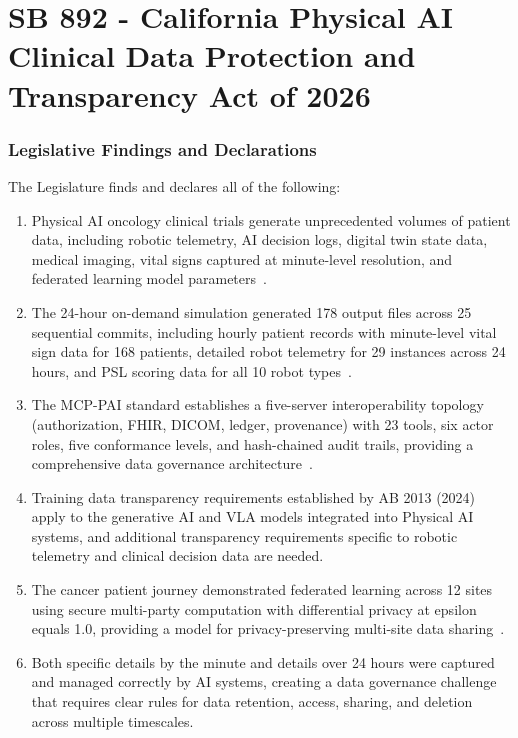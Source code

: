 

\part{SB 892 - California Physical AI Clinical Data Protection and Transparency Act of 2026}
\setcounter{section}{0}

\section{Legislative Findings and Declarations}

The Legislature finds and declares all of the following:

\begin{enumerate}[label=(\alph*)]
\item Physical AI oncology clinical trials generate unprecedented volumes of
  patient data, including robotic telemetry, AI decision logs, digital twin
  state data, medical imaging, vital signs captured at minute-level resolution,
  and federated learning model parameters~\cite{newtrial2026}.

\item The 24-hour on-demand simulation generated 178 output files across 25
  sequential commits, including hourly patient records with minute-level vital
  sign data for 168 patients, detailed robot telemetry for 29 instances across
  24 hours, and PSL scoring data for all 10 robot
  types~\cite{newtrial2026}.

\item The MCP-PAI standard establishes a five-server interoperability topology
  (authorization, FHIR, DICOM, ledger, provenance) with 23 tools, six actor
  roles, five conformance levels, and hash-chained audit trails, providing a
  comprehensive data governance architecture~\cite{iche6r3adapt}.

\item Training data transparency requirements established by AB 2013 (2024)
  apply to the generative AI and VLA models integrated into Physical AI
  systems, and additional transparency requirements specific to robotic
  telemetry and clinical decision data are needed.

\item The cancer patient journey demonstrated federated learning across 12 sites
  using secure multi-party computation with differential privacy at epsilon
  equals 1.0, providing a model for privacy-preserving multi-site data
  sharing~\cite{patientjourney2026}.

\item Both specific details by the minute and details over 24 hours were
  captured and managed correctly by AI systems, creating a data governance
  challenge that requires clear rules for data retention, access, sharing, and
  deletion across multiple timescales.
\end{enumerate}

